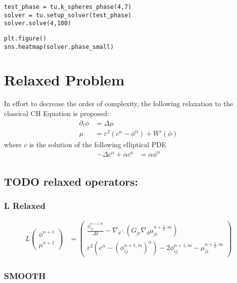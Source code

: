 \documentclass[11pt]{article}
\begin{document}
\begin{verbatim}
test_phase = tu.k_spheres_phase(4,7)
solver = tu.setup_solver(test_phase)
solver.solve(4,100)
\end{verbatim}

\begin{verbatim}
plt.figure()
sns.heatmap(solver.phase_small)
\end{verbatim}
\section{Relaxed Problem}
\label{sec:orgd48be93}
In effort to decrease the order of complexity, the following relaxation to the classical CH Equation is proposed:
\begin{align*}
\partial_t \phi  &= \Delta \mu \\
\mu &= \varepsilon ^2(c^\alpha - \phi^\alpha) + W'(\phi)
\end{align*}
where \(c\) is the solution of the following elliptical PDE
\begin{align*}
- \Delta c^\alpha  + \alpha c^a &= \alpha \phi ^\alpha
\end{align*}
\subsection{{\bfseries\sffamily TODO} relaxed operators:}
\label{sec:org40348c5}
\subsubsection{L Relaxed}
\label{sec:orgec38c94}
\begin{align*}
L
\begin{pmatrix}
\phi ^{n+1} \\
\mu^{n+1}
\end{pmatrix}
&=
\begin{pmatrix}
\frac{\phi^{n+1,m}_{ij}}{\Delta t} - \nabla _d \cdot (G_{ji} \nabla _d \mu^{n + \frac{1}{2},m}_{ji}) \\
\varepsilon ^2 (c^\alpha - (\phi^{n+1,m}_{ij})^\alpha) - 2\phi ^{n+1,m}_{ij} -\mu^{n + \frac{1}{2},m}_{ji}
\end{pmatrix}
\end{align*}
\subsubsection{SMOOTH}
\label{sec:org221d270}
\end{document}
